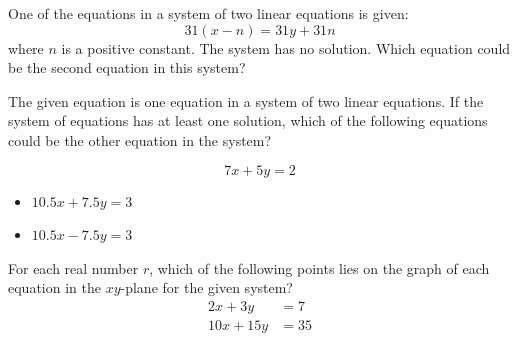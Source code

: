 \vspace{0.75em}


\noindent\markforreview
\vspace{1em}
\vspace{1em}

One of the equations in a system of two linear equations is given:  
\[
31(x - n) = 31y + 31n
\]  
where \(n\) is a positive constant.  
The system has no solution. Which equation could be the second equation in this system?

\vspace{0.75em}


\vspace{2em}

\newpage

\noindent\markforreview
\vspace{1em}
\vspace{1em}

The given equation is one equation in a system of two linear equations.  
If the system of equations has at least one solution, which of the following equations could be the other equation in the system?

\[
7x + 5y = 2
\]

\begin{itemize}
    \item[I.] \(10.5x + 7.5y = 3\)
    \item[II.] \(10.5x - 7.5y = 3\)
\end{itemize}



\vspace{2em}

\noindent\markforreview
\vspace{1em}
\vspace{1em}

For each real number \( r \), which of the following points lies on the graph of each equation in the \( xy \)-plane for the given system?
\[
\begin{aligned}
2x + 3y &= 7 \\
10x + 15y &= 35
\end{aligned}
\]


